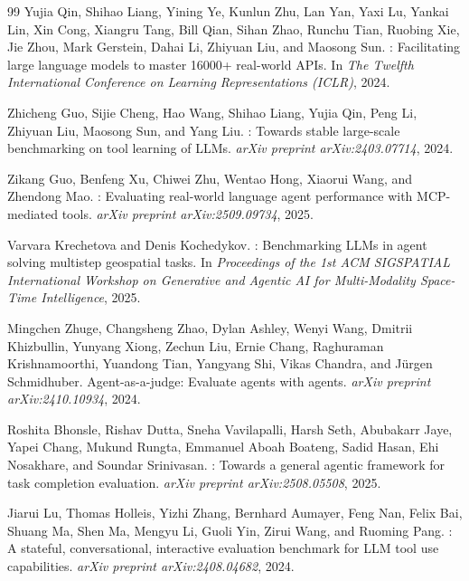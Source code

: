 \begin{thebibliography}{99}
Yujia Qin, Shihao Liang, Yining Ye, Kunlun Zhu, Lan Yan, Yaxi Lu, Yankai Lin, Xin Cong, Xiangru Tang, Bill Qian, Sihan Zhao, Runchu Tian, Ruobing Xie, Jie Zhou, Mark Gerstein, Dahai Li, Zhiyuan Liu, and Maosong Sun.
: Facilitating large language models to master 16000+ real-world {APIs}.
\newblock In \emph{The Twelfth International Conference on Learning Representations (ICLR)}, 2024.

Zhicheng Guo, Sijie Cheng, Hao Wang, Shihao Liang, Yujia Qin, Peng Li, Zhiyuan Liu, Maosong Sun, and Yang Liu.
: Towards stable large-scale benchmarking on tool learning of {LLMs}.
\newblock \emph{arXiv preprint arXiv:2403.07714}, 2024.

Zikang Guo, Benfeng Xu, Chiwei Zhu, Wentao Hong, Xiaorui Wang, and Zhendong Mao.
: Evaluating real-world language agent performance with {MCP}-mediated tools.
\newblock \emph{arXiv preprint arXiv:2509.09734}, 2025.

Varvara Krechetova and Denis Kochedykov.
: Benchmarking {LLMs} in agent solving multistep geospatial tasks.
\newblock In \emph{Proceedings of the 1st ACM SIGSPATIAL International Workshop on Generative and Agentic AI for Multi-Modality Space-Time Intelligence}, 2025.

Mingchen Zhuge, Changsheng Zhao, Dylan Ashley, Wenyi Wang, Dmitrii Khizbullin, Yunyang Xiong, Zechun Liu, Ernie Chang, Raghuraman Krishnamoorthi, Yuandong Tian, Yangyang Shi, Vikas Chandra, and J{\"u}rgen Schmidhuber.
\newblock Agent-as-a-judge: Evaluate agents with agents.
\newblock \emph{arXiv preprint arXiv:2410.10934}, 2024.

Roshita Bhonsle, Rishav Dutta, Sneha Vavilapalli, Harsh Seth, Abubakarr Jaye, Yapei Chang, Mukund Rungta, Emmanuel Aboah Boateng, Sadid Hasan, Ehi Nosakhare, and Soundar Srinivasan.
: Towards a general agentic framework for task completion evaluation.
\newblock \emph{arXiv preprint arXiv:2508.05508}, 2025.

Jiarui Lu, Thomas Holleis, Yizhi Zhang, Bernhard Aumayer, Feng Nan, Felix Bai, Shuang Ma, Shen Ma, Mengyu Li, Guoli Yin, Zirui Wang, and Ruoming Pang.
: A stateful, conversational, interactive evaluation benchmark for {LLM} tool use capabilities.
\newblock \emph{arXiv preprint arXiv:2408.04682}, 2024.

\end{thebibliography}
